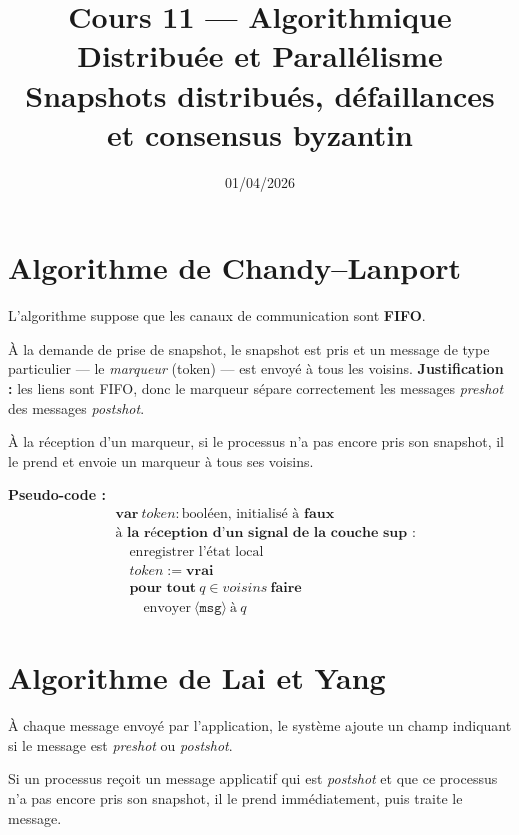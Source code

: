 \documentclass[12pt,a4paper]{article}
\title{\textbf{Cours 11 — Algorithmique Distribuée et Parallélisme}\\
       \large Snapshots distribués, défaillances et consensus byzantin}
\date{01/04/2026}
\author{}
\theoremstyle{definition}
\theoremstyle{plain}
\theoremstyle{remark}
\newcommand{\msg}{\mathtt{msg}}
\begin{document}
\maketitle
\tableofcontents
\newpage

\section{Algorithme de Chandy--Lanport}

L'algorithme suppose que les canaux de communication sont \textbf{FIFO}.

À la demande de prise de snapshot, le snapshot est pris et un message de type
particulier --- le \emph{marqueur} (token) --- est envoyé à tous les voisins.
\textbf{Justification :} les liens sont FIFO, donc le marqueur sépare
correctement les messages \emph{preshot} des messages \emph{postshot}.

À la réception d'un marqueur, si le processus n'a pas encore pris son snapshot,
il le prend et envoie un marqueur à tous ses voisins.

\bigskip
\noindent\textbf{Pseudo-code :}
\begin{align*}
&\textbf{var}\ \mathit{token} : \text{booléen, initialisé à } \mathbf{faux}\\[4pt]
&\textbf{à la réception d'un signal de la couche sup :}\\
&\quad \text{enregistrer l'état local}\\
&\quad \mathit{token} := \mathbf{vrai}\\
&\quad \textbf{pour tout}\ q \in \mathit{voisins}\ \textbf{faire}\\
&\qquad \text{envoyer}\ \langle \msg \rangle\ \text{à}\ q
\end{align*}

\section{Algorithme de Lai et Yang}

À chaque message envoyé par l'application, le système ajoute un champ indiquant
si le message est \emph{preshot} ou \emph{postshot}.

Si un processus reçoit un message applicatif qui est \emph{postshot} et que ce
processus n'a pas encore pris son snapshot, il le prend immédiatement, puis
traite le message.
\end{document}

